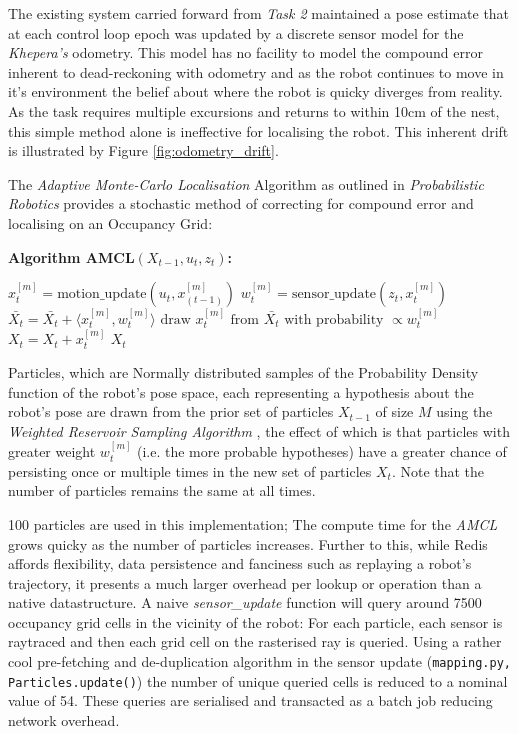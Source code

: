 \documentclass[11pt, a4paper]{article}
\begin{document}
The existing system carried forward from \textit{Task 2} \cite{task2_report} maintained a pose estimate
that at each control loop epoch was updated by a discrete sensor model for the \textit{Khepera's} 
odometry. This model has no facility to model the compound error inherent to dead-reckoning with
odometry and as the robot continues to move in it's environment the belief about where the robot is quicky 
diverges from reality. As the task requires multiple excursions and returns to within 10cm of the nest,
this simple method alone is ineffective for localising the robot. This inherent drift is illustrated by
Figure \ref{fig:odometry_drift}.

The \textit{Adaptive Monte-Carlo Localisation} Algorithm as outlined in 
\textit{Probabilistic Robotics} \cite{probabilisticrobot} provides a stochastic method of correcting
for compound error and localising on an Occupancy Grid:

\textbf{\large Algorithm AMCL${(X_{t-1}, u_t, z_t)}$:}
\begin{algorithmic}
  \STATE $x_{t}^{[m]}= \textrm{motion\_update}(u_{t},x_{(t-1)}^{[m]})$
  \STATE $w_{t}^{[m]}= \textrm{sensor\_update}(z_{t},x_{t}^{[m]})$
  \STATE $\bar{X_{t}}=\bar{X_{t}}+\langle x_{t}^{[m]},w_{t}^{[m]}\rangle $
  \ENDFOR
  \STATE $\textrm{draw } x_{t}^{[m]} \textrm{ from } \bar{X_{t}} \textrm{ with probability } \propto w_{t}^{[m]}$
  \STATE $X_{t}=X_{t}+x_{t}^{[m]}$
  \ENDFOR
  \RETURN $X_{t}$
\end{algorithmic}

Particles, which are Normally distributed samples of the Probability Density function of the robot's 
pose space, each representing a hypothesis about the robot's pose are drawn from the prior set 
of particles ${X_{t-1}}$ of size $M$ using the \textit{Weighted Reservoir 
Sampling Algorithm} \cite{reservoirsample}, the effect of which is that particles with greater 
weight ${w_t^{[m]}}$ (i.e. the more probable hypotheses) have a greater chance of persisting once 
or multiple times in the new set of particles ${X_t}$. Note that the number of particles remains 
the same at all times.

100 particles are used in this implementation; The compute time for the \textit{AMCL} grows quicky
as the number of particles increases. Further to this, while Redis affords flexibility, data persistence
and fanciness such as replaying a robot's trajectory, it presents a much larger overhead per lookup
or operation than a native datastructure. A naive \textit{sensor\_update} function will query
around 7500 occupancy grid cells in the vicinity of the robot: For each particle, each sensor is 
raytraced and then each grid cell on the rasterised ray is queried. Using a rather cool pre-fetching
and de-duplication algorithm in the sensor update (\texttt{mapping.py, Particles.update()}) the number
of unique queried cells is reduced to a nominal value of 54. These queries are serialised and
transacted as a batch job reducing network overhead.
\end{document}

